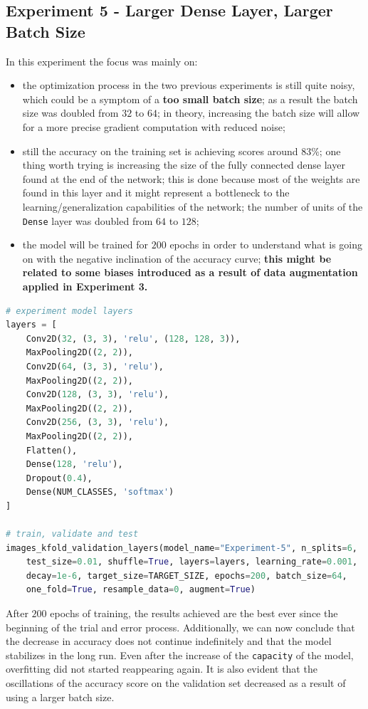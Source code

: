 \documentclass[11pt,a4paper]{article}
\begin{document}
\subsection{Experiment 5 - Larger Dense Layer, Larger Batch Size}
In this experiment the focus was mainly on:
\begin{itemize}
    \item the optimization process in the two previous experiments is still quite noisy, which could be a symptom of a \textbf{too small batch size}; as a result the batch size was doubled from $32$ to $64$; in theory, increasing the batch size will allow for a more precise gradient computation with reduced noise;
    \item still the accuracy on the training set is achieving scores around $83\%$; one thing worth trying is increasing the size of the fully connected dense layer found at the end of the network; this is done because most of the weights are found in this layer and it might represent a bottleneck to the learning/generalization capabilities of the network; the number of units of the \texttt{Dense} layer was doubled from $64$ to $128$;
    \item the model will be trained for $200$ epochs in order to understand what is going on with the negative inclination of the accuracy curve; \textbf{this might be related to some biases introduced as a result of data augmentation applied in Experiment 3.}
\end{itemize}
\begin{lstlisting}[language=Python,frame=single]
# experiment model layers
layers = [
    Conv2D(32, (3, 3), 'relu', (128, 128, 3)),
    MaxPooling2D((2, 2)),
    Conv2D(64, (3, 3), 'relu'),
    MaxPooling2D((2, 2)),
    Conv2D(128, (3, 3), 'relu'),
    MaxPooling2D((2, 2)),
    Conv2D(256, (3, 3), 'relu'),
    MaxPooling2D((2, 2)),
    Flatten(),
    Dense(128, 'relu'),
    Dropout(0.4),
    Dense(NUM_CLASSES, 'softmax')
]

# train, validate and test
images_kfold_validation_layers(model_name="Experiment-5", n_splits=6,
    test_size=0.01, shuffle=True, layers=layers, learning_rate=0.001,
    decay=1e-6, target_size=TARGET_SIZE, epochs=200, batch_size=64,
    one_fold=True, resample_data=0, augment=True)
\end{lstlisting}
After $200$ epochs of training, the results achieved are the best ever since the beginning of the trial and error process. Additionally, we can now conclude that the decrease in accuracy does not continue indefinitely and that the model stabilizes in the long run. Even after the increase of the \texttt{capacity} of the model, overfitting did not started reappearing again. It is also evident that the oscillations of the accuracy score on the validation set decreased as a result of using a larger batch size.
\end{document}
